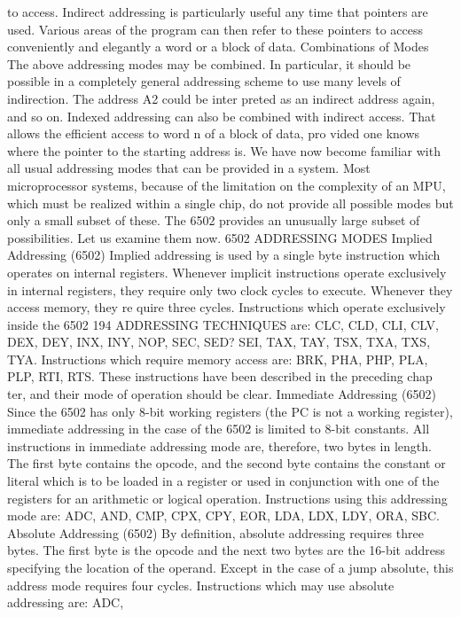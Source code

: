 \documentclass{book}
\begin{document}
to access.
Indirect addressing is particularly useful any time that pointers
are used. Various areas of the program can then refer to these
pointers to access conveniently and elegantly a word or a block of
data.
Combinations of Modes
The above addressing modes may be combined. In particular, it
should be possible in a completely general addressing scheme to
use many levels of indirection. The address A2 could be inter
preted as an indirect address again, and so on.
Indexed addressing can also be combined with indirect access.
That allows the efficient access to word n of a block of data, pro
vided one knows where the pointer to the starting address is.
We have now become familiar with all usual addressing modes
that can be provided in a system. Most microprocessor systems,
because of the limitation on the complexity of an MPU, which
must be realized within a single chip, do not provide all possible
modes but only a small subset of these. The 6502 provides an
unusually large subset of possibilities. Let us examine them now.
6502 ADDRESSING MODES
Implied Addressing (6502)
Implied addressing is used by a single byte instruction which
operates on internal registers. Whenever implicit instructions
operate exclusively in internal registers, they require only two
clock cycles to execute. Whenever they access memory, they re
quire three cycles.
Instructions which operate exclusively inside the 6502
194
ADDRESSING TECHNIQUES
are: CLC, CLD, CLI, CLV, DEX, DEY, INX, INY, NOP, SEC, SED?
SEI, TAX, TAY, TSX, TXA, TXS, TYA.
Instructions which require memory access are: BRK, PHA,
PHP, PLA, PLP, RTI, RTS.
These instructions have been described in the preceding chap
ter, and their mode of operation should be clear.
Immediate Addressing (6502)
Since the 6502 has only 8-bit working registers (the PC is not a
working register), immediate addressing in the case of the 6502 is
limited to 8-bit constants. All instructions in immediate addressing
mode are, therefore, two bytes in length. The first byte contains
the opcode, and the second byte contains the constant or literal
which is to be loaded in a register or used in conjunction with one
of the registers for an arithmetic or logical operation.
Instructions using this addressing mode are: ADC, AND, CMP,
CPX, CPY, EOR, LDA, LDX, LDY, ORA, SBC.
Absolute Addressing (6502)
By definition, absolute addressing requires three bytes. The
first byte is the opcode and the next two bytes are the 16-bit
address specifying the location of the operand. Except in the case
of a jump absolute, this address mode requires four cycles.
Instructions which may use absolute addressing are: ADC,
\end{document}
